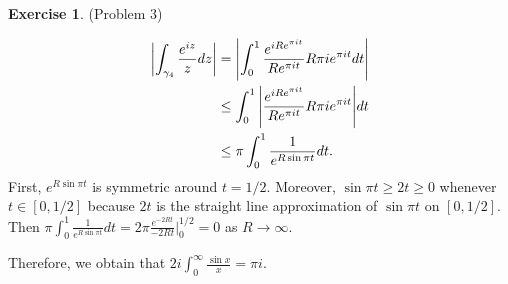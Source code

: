 \documentclass[12pt, psamsfonts]{amsart}
\theoremstyle{definition}
\newtheorem*{exer}{Exercise}
\theoremstyle{remark}
\numberwithin{equation}{section}
\begin{document}
\begin{exer}{(Problem 3)}
\begin{itemize}
      \begin{align*}
        \abs{\int_{\gamma_4} \frac{e^{iz}}{z} dz}
          &= \abs{\int_{0}^{1} \frac{e^{iRe^{\pi i t}}}{Re^{\pi i t}}R\pi i e^{\pi i t} dt } \\
          &\leq \int_{0}^{1} \abs{\frac{e^{iRe^{\pi i t}}}{Re^{\pi i t}}R\pi i e^{\pi i t}} dt \\
          &\leq \pi \int_{0}^{1} \frac{1}{e^{R\sin \pi t}} dt.
      \end{align*}
      First, $e^{R\sin \pi t}$ is symmetric around $t = 1/2$.
      Moreover, $\sin \pi t \geq 2t \geq 0$ whenever $t \in [0, 1/2]$ because $2t$ is the straight line approximation of $\sin \pi t$ on $[0, 1 / 2]$.
      Then $\pi \int_{0}^{1} \frac{1}{e^{R\sin \pi t}} dt = 2\pi \frac{e^{-2Rt}}{-2Rt}\big\vert^{1/2}_{0} = 0$ as $R \rightarrow \infty$.
  \end{itemize}
  Therefore, we obtain that $2i\int_{0}^{\infty} \frac{\sin x}{x} = \pi i$.
\end{exer}
\end{document}
